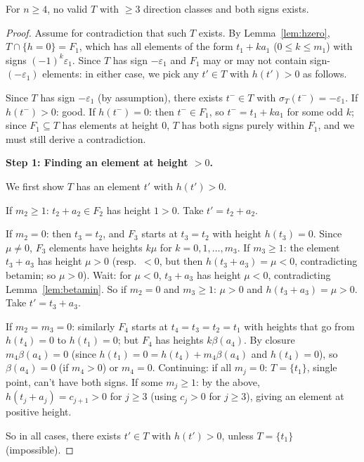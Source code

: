 \begin{lemma}\label{lem:minhgt}
For $n \geq 4$, no valid $T$ with $\geq 3$ direction classes and both signs exists.
\end{lemma}
\begin{proof}
Assume for contradiction that such $T$ exists.
By Lemma~\ref{lem:hzero}, $T \cap \{h=0\} = F_1$, which has all elements of
the form $t_1+ka_1$ ($0 \leq k \leq m_1$) with signs $(-1)^k\varepsilon_1$.
Since $T$ has sign $-\varepsilon_1$ and $F_1$ may or may not contain sign-$(-\varepsilon_1)$
elements: in either case, we pick any $t' \in T$ with $h(t') > 0$ as follows.

Since $T$ has sign $-\varepsilon_1$ (by assumption), there exists $t^- \in T$ with
$\sigma_T(t^-) = -\varepsilon_1$.  If $h(t^-) > 0$: good.  If $h(t^-)=0$: then
$t^- \in F_1$, so $t^- = t_1+ka_1$ for some odd $k$; since $F_1 \subseteq T$ has
elements at height 0, $T$ has both signs purely within $F_1$, and we must still derive a contradiction.

\medskip
\noindent\textbf{Step 1: Finding an element at height $> 0$.}

We first show $T$ has an element $t'$ with $h(t')>0$.

If $m_2 \geq 1$: $t_2+a_2 \in F_2$ has height $1 > 0$.  Take $t' = t_2+a_2$.

If $m_2 = 0$: then $t_3 = t_2$, and $F_3$ starts at $t_3=t_2$ with height $h(t_3)=0$.
Since $\mu \neq 0$, $F_3$ elements have heights $k\mu$ for $k=0,1,\ldots,m_3$.
If $m_3 \geq 1$: the element $t_3+a_3$ has height $\mu > 0$ (resp.\ $< 0$, but
then $h(t_3+a_3) = \mu < 0$, contradicting betamin; so $\mu > 0$).
Wait: for $\mu < 0$, $t_3+a_3$ has height $\mu < 0$, contradicting Lemma~\ref{lem:betamin}.
So if $m_2=0$ and $m_3 \geq 1$: $\mu > 0$ and $h(t_3+a_3) = \mu > 0$.  Take $t' = t_3+a_3$.

If $m_2=m_3=0$: similarly $F_4$ starts at $t_4=t_3=t_2=t_1$ with heights that go from
$h(t_4)=0$ to $h(t_1)=0$; but $F_4$ has heights $k\beta(a_4)$. By closure
$m_4\beta(a_4)=0$ (since $h(t_1)=0=h(t_4)+m_4\beta(a_4)$ and $h(t_4)=0$), so $\beta(a_4)=0$
(if $m_4>0$) or $m_4=0$.  Continuing: if all $m_j=0$: $T=\{t_1\}$, single point,
can't have both signs.  If some $m_j \geq 1$: by the above, $h(t_j+a_j) = c_{j+1} > 0$
for $j \geq 3$ (using $c_j > 0$ for $j \geq 3$), giving an element at positive height.

So in all cases, there exists $t' \in T$ with $h(t') > 0$, unless $T = \{t_1\}$ (impossible).


\end{proof}
